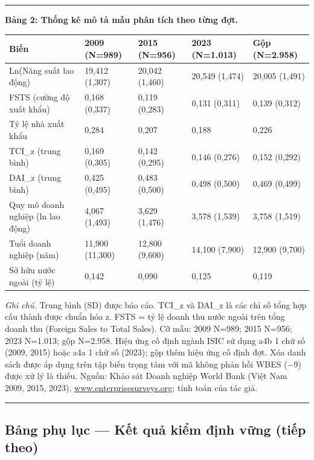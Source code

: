 \documentclass[12pt,a4paper]{article}
\begin{document}
\begin{center}\rule{0.5\linewidth}{0.5pt}\end{center}

\textbf{Bảng 2: Thống kê mô tả mẫu phân tích theo từng đợt.}

\begin{longtable}[]{@{}lllll@{}}
\toprule\noalign{}
Biến & 2009 (N=989) & 2015 (N=956) & 2023 (N=1.013) & Gộp (N=2.958) \\
\midrule\noalign{}
\endhead
\bottomrule\noalign{}
\endlastfoot
Ln(Năng suất lao động) & 19,412 (1,307) & 20,042 (1,460) & 20,549
(1,474) & 20,005 (1,491) \\
FSTS (cường độ xuất khẩu) & 0,168 (0,337) & 0,119 (0,283) & 0,131
(0,311) & 0,139 (0,312) \\
Tỷ lệ nhà xuất khẩu & 0,284 & 0,207 & 0,188 & 0,226 \\
TCI\_z (trung bình) & 0,169 (0,305) & 0,142 (0,295) & 0,146 (0,276) &
0,152 (0,292) \\
DAI\_z (trung bình) & 0,425 (0,495) & 0,483 (0,500) & 0,498 (0,500) &
0,469 (0,499) \\
Quy mô doanh nghiệp (ln lao động) & 4,067 (1,493) & 3,629 (1,476) &
3,578 (1,539) & 3,758 (1,519) \\
Tuổi doanh nghiệp (năm) & 11,900 (11,300) & 12,800 (9,600) & 14,100
(7,900) & 12,900 (9,700) \\
Sở hữu nước ngoài (tỷ lệ) & 0,142 & 0,090 & 0,125 & 0,119 \\
\end{longtable}

\emph{Ghi chú.} Trung bình (SD) được báo cáo. TCI\_z và DAI\_z là các
chỉ số tổng hợp cấu thành được chuẩn hóa z. FSTS = tỷ lệ doanh thu nước
ngoài trên tổng doanh thu (Foreign Sales to Total Sales). Cỡ mẫu: 2009
N=989; 2015 N=956; 2023 N=1.013; gộp N=2.958. Hiệu ứng cố định ngành
ISIC sử dụng a4b 1 chữ số (2009, 2015) hoặc a4a 1 chữ số (2023); gộp
thêm hiệu ứng cố định đợt. Xóa danh sách được áp dụng trên tập biến
trọng tâm với mã không phản hồi WBES (−9) được xử lý là thiếu. Nguồn:
Khảo sát Doanh nghiệp World Bank (Việt Nam 2009, 2015, 2023),
\href{http://www.enterprisesurveys.org;}{www.enterprisesurveys.org;}
tính toán của tác giả.

\begin{center}\rule{0.5\linewidth}{0.5pt}\end{center}

\hypertarget{bux1ea3ng-phux1ee5-lux1ee5c--kux1ebft-quux1ea3-kiux1ec3m-ux111ux1ecbnh-vux1eefng-tiux1ebfp-theo}{%
\subsection{Bảng phụ lục --- Kết quả kiểm định vững (tiếp
theo)}\label{bux1ea3ng-phux1ee5-lux1ee5c--kux1ebft-quux1ea3-kiux1ec3m-ux111ux1ecbnh-vux1eefng-tiux1ebfp-theo}}
\end{document}

